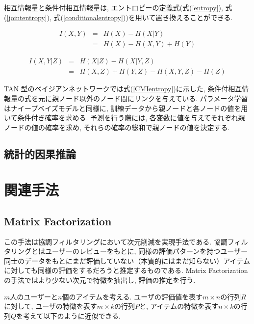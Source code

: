 \documentclass[a4paper]{jarticle}
\begin{document}
相互情報量と条件付相互情報量は, エントロピーの定義式(式(\ref{entropy}), 式(\ref{jointentropy}), 式(\ref{conditionalentropy}))を用いて置き換えることができる.  

\begin{eqnarray}
\label{MIentropy}
I(X, Y) &=& H(X) - H(X|Y) \nonumber \\
         &=& H(X) - H(X, Y) + H(Y)
\end{eqnarray}

\begin{eqnarray}
\label{CMIentropy}
I(X, Y | Z) &=& H(X| Z) - H(X| Y, Z) \nonumber \\
               &=& H(X, Z) + H(Y, Z) - H(X, Y, Z) - H(Z)
\end{eqnarray}

TAN 型のベイジアンネットワークでは式(\ref{CMIentropy})に示した, 条件付相互情報量の式を元に親ノード以外のノード間にリンクを与えている. パラメータ学習はナイーブベイズモデルと同様に,  訓練データから親ノードと各ノードの値を用いて条件付き確率を求める. 予測を行う際には, 各変数に値を与えてそれぞれ親ノードの値の確率を求め, それらの確率の総和で親ノードの値を決定する.

\subsection{統計的因果推論}




\section{関連手法}

\subsection{Matrix Factorization}

この手法は協調フィルタリングにおいて次元削減を実現手法である. 協調フィルタリングとはユーザーのレビューをもとに, 同様の評価パターンを持つユーザー同士のデータをもとにまだ評価していない（本質的にはまだ知らない）アイテムに対しても同様の評価をするだろうと推定するものである. Matrix Factorization の手法ではより少ない次元で特徴を抽出し, 評価の推定を行う.~\cite{Koren}

$m$人のユーザーと$n$個のアイテムを考える. ユーザの評価値を表す$m \times n$の行列$R$に対して, ユーザの特徴を表す$m \times k$の行列$P$と, アイテムの特徴を表す$n \times k$の行列$Q$を考えて以下のように近似できる.
\end{document}
